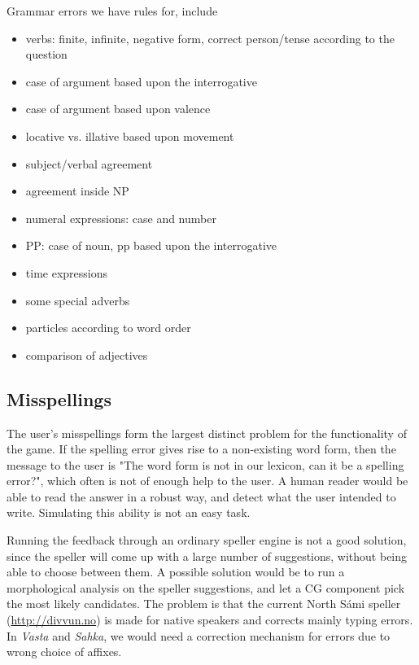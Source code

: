 \documentclass[11pt]{article}
\begin{document}
Grammar errors we have rules for, include
\begin{itemize}
\setlength{\itemsep}{-0.2cm}
\item verbs: finite, infinite, negative form, correct person/tense according to the question
\item case of argument based upon the interrogative 
\item case of argument based upon valence
\item locative vs. illative based upon movement
\item subject/verbal agreement
\item agreement inside NP 
\item numeral expressions: case and number 
\item PP: case of noun, pp based upon the interrogative 
\item time expressions 
\item some special adverbs 
\item particles according to word order
\item comparison of adjectives
\end{itemize}

\subsection{Misspellings}
The user's misspellings form the largest distinct problem for the functionality of the game. If the spelling error gives rise to a non-existing word form, then the message to the user is "The word form is not in our lexicon, can it be a spelling error?", which often is not of enough help to the user. A human reader would be able to read the answer in a robust way, and detect what the user intended to write. Simulating this ability is not an easy task.
 
Running the feedback through an ordinary speller engine is not a good solution, since the speller will come up with a large number of suggestions, without being able to choose between them. A possible solution would be to run a morphological analysis on the speller suggestions, and let a CG component pick the most likely candidates. The problem is that the current North Sámi speller (\url{http://divvun.no}) is made for native speakers and corrects mainly typing errors. In \textit{Vasta} and \textit{Sahka}, we would need a correction mechanism for errors due to wrong choice of affixes.
\end{document}
